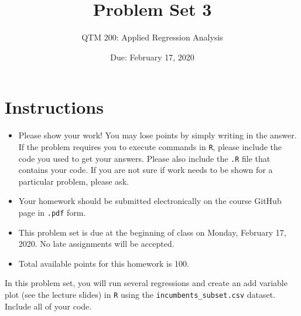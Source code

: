 \documentclass[12pt,letterpaper]{article}
\title{Problem Set 3}
\date{Due: February 17, 2020}
\author{QTM 200: Applied Regression Analysis}
\begin{document}
	\maketitle
	
	\section*{Instructions}
	\begin{itemize}
		\item Please show your work! You may lose points by simply writing in the answer. If the problem requires you to execute commands in \texttt{R}, please include the code you used to get your answers. Please also include the \texttt{.R} file that contains your code. If you are not sure if work needs to be shown for a particular problem, please ask.
		\item Your homework should be submitted electronically on the course GitHub page in \texttt{.pdf} form.
		\item This problem set is due at the beginning of class on Monday, February 17, 2020. No late assignments will be accepted.
		\item Total available points for this homework is 100.
	\end{itemize}
	
		\vspace{.25cm}
	
\noindent In this problem set, you will run several regressions and create an add variable plot (see the lecture slides) in \texttt{R} using the \texttt{incumbents\_subset.csv} dataset. Include all of your code.

	\vspace{.5cm}
\end{document}
